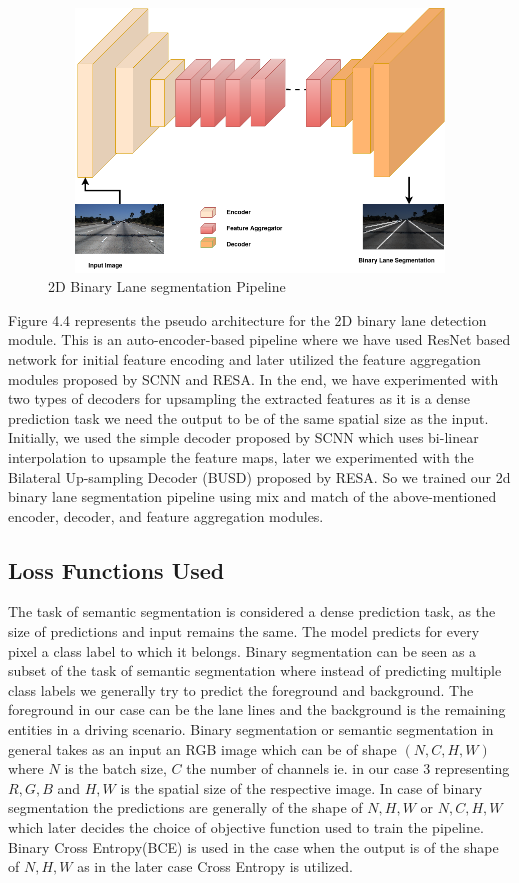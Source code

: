            \begin{figure}[h]
    \centering
    \includegraphics[width=12cm, height=7cm]{images/2dlane_pipleline.png}
    \caption{2D Binary Lane segmentation Pipeline}
    \end{figure}
        
        Figure 4.4 represents the pseudo architecture for the 2D binary lane detection module. This is an auto-encoder-based pipeline where we have used ResNet \cite{DBLP:journals/corr/HeZRS15} based network for initial feature encoding and later utilized the feature aggregation modules proposed by SCNN\cite{pan2018SCNN} and RESA\cite{DBLP:journals/corr/abs-2008-13719}. In the end, we have experimented with two types of decoders for upsampling the extracted features as it is a dense prediction task we need the output to be of the same spatial size as the input. Initially, we used the simple decoder proposed by SCNN\cite{pan2018SCNN} which uses bi-linear interpolation to upsample the feature maps, later we experimented with the Bilateral Up-sampling Decoder (BUSD) proposed by RESA\cite{DBLP:journals/corr/abs-2008-13719}. So we trained our 2d binary lane segmentation pipeline using mix and match of the above-mentioned encoder, decoder, and feature aggregation modules.
        
        \subsection{Loss Functions Used}
        The task of semantic segmentation is considered a dense prediction task, as the size of predictions and input remains the same. The model predicts for every pixel a class label to which it belongs. Binary segmentation can be seen as a subset of the task of semantic segmentation where instead of predicting multiple class labels we generally try to predict the foreground and background. The foreground in our case can be the lane lines and the background is the remaining entities in a driving scenario.
        Binary segmentation or semantic segmentation in general takes as an input an RGB image which can be of shape $(N,C,H,W)$ where $N$ is the batch size, $C$ the number of channels ie. in our case 3 representing $R, G, B$ and $H,W$ is the spatial size of the respective image. In case of binary segmentation the predictions are generally of the shape of $N,H,W$ or $N,C,H,W$ which later decides the choice of objective function used to train the pipeline. Binary Cross Entropy(BCE) is used in the case when the output is of the shape of $N,H,W$ as in the later case Cross Entropy is utilized.
        
